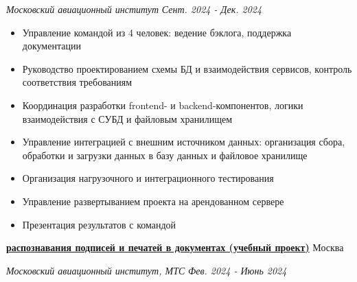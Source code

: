 \documentclass[14pt, a4paper, oneside]{extarticle}
\begin{document}
\begin{flushleft}
	\vspace{-1\intextsep}
	\quad
	\textit{Московский авиационный институт}
	\hfill
	\textit{\small Сент. 2024 - Дек. 2024}
\end{flushleft}


\begin{itemize}
	\vspace{-2\intextsep}
    \item Управление командой из 4 человек: ведение бэклога, поддержка документации
	\vspace{-0.8\intextsep}
	\item Руководство проектированием схемы БД и взаимодействия сервисов, контроль соответствия требованиям
	\vspace{-0.8\intextsep}
	\item Координация разработки frontend- и backend-компонентов, логики взаимодействия с СУБД и файловым хранилищем
	\vspace{-0.8\intextsep}
	\item Управление интеграцией с внешним источником данных: организация сбора, обработки и загрузки данных в базу данных и файловое хранилище
	\vspace{-0.8\intextsep}
    \item Организация нагрузочного и интеграционного тестирования
    \vspace{-0.8\intextsep}
    \item Управление развертыванием проекта на арендованном сервере
    \vspace{-0.8\intextsep}
    \item Презентация результатов с командой
\end{itemize}


\begin{flushleft}
	\vspace{-0.8\intextsep}
	\quad
	\href{https://github.com/Crazy5202/CM_2024}{\textbf{ распознавания подписей и печатей в документах (учебный проект)}}
	\hfill
	Москва
\end{flushleft}

\begin{flushleft}
	\vspace{-1\intextsep}
	\quad
	\textit{Московский авиационный институт, МТС}
	\hfill
	\textit{\small Фев. 2024 - Июнь 2024}
\end{flushleft}
\end{document}
